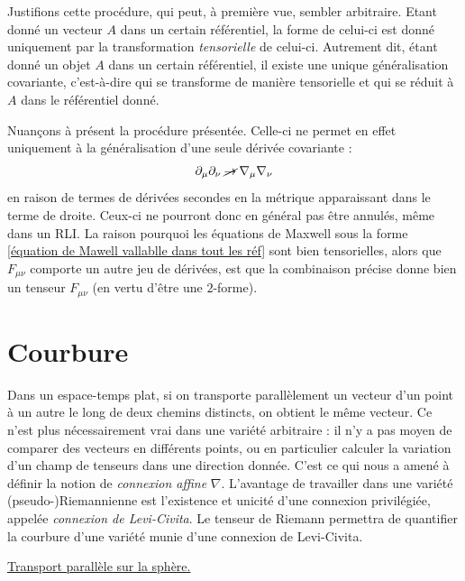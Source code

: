 \begin{rmk}
    Justifions cette procédure, qui peut, à première vue, sembler arbitraire. Etant donné un vecteur $A$ dans un certain référentiel, la forme de celui-ci est donné uniquement par la transformation \emph{tensorielle} de celui-ci. Autrement dit, étant donné un objet $A$ dans un certain référentiel, il existe une unique généralisation covariante, c'est-à-dire qui se transforme de manière tensorielle et qui se réduit à $A$ dans le référentiel donné.
\end{rmk}
\begin{rmk}
    Nuançons à présent la procédure présentée. Celle-ci ne permet en effet uniquement à la généralisation d'une seule dérivée covariante :
    \begin{align}
        \partial_\mu \partial_\nu \:\cancel{\to}\: \nabla_\mu \nabla_\nu
    \end{align}
    en raison de termes de dérivées secondes en la métrique apparaissant dans le terme de droite. Ceux-ci ne pourront donc en général pas être annulés, même dans un RLI. La raison pourquoi les équations de Maxwell sous la forme \ref{équation de Mawell vallablle dans tout les réf} sont bien tensorielles, alors que $F_{\mu\nu}$ comporte un autre jeu de dérivées, est que la combinaison précise donne bien un tenseur $F_{\mu\nu}$ (en vertu d'être une $2$-forme).
\end{rmk}
\section{Courbure}
Dans un espace-temps plat, si on transporte parallèlement un vecteur d'un point à un autre le long de deux chemins distincts, on obtient le même vecteur. Ce n'est plus nécessairement vrai dans une variété arbitraire : il n'y a pas moyen de comparer des vecteurs en différents points, ou en particulier calculer la variation d'un champ de tenseurs dans une direction donnée. C'est ce qui nous a amené à définir la notion de \emph{connexion affine} $\nabla$. L'avantage de travailler dans une variété (pseudo-)Riemannienne est l'existence et unicité d'une connexion privilégiée, appelée \emph{connexion de Levi-Civita}. Le tenseur de Riemann permettra de quantifier la courbure d'une variété munie d'une connexion de Levi-Civita.
\begin{exmp}
    \href{https://youtu.be/Af9JUiQtV1k?si=aQAsikQre4qSr2fq}{Transport parallèle sur la sphère.}
\end{exmp}
